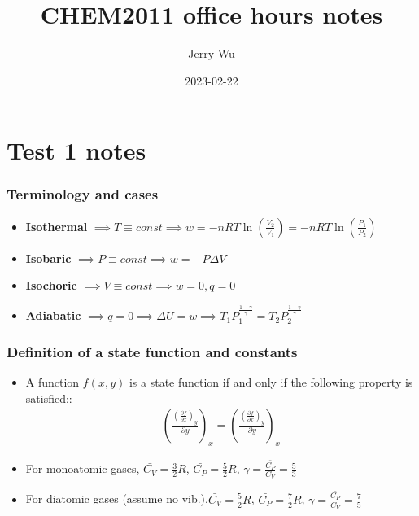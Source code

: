 \documentclass[12pt]{book}
\title{CHEM2011 office hours notes}
\author{Jerry Wu}
\date{2023-02-22}
\begin{document}
\maketitle
\chapter*{Test 1 notes}

\subsection*{Terminology and cases}

\begin{itemize}
    \item \textbf{Isothermal} $\implies T\equiv const\implies w=-nRT\ln(\frac{V_2}{V_1})=-nRT\ln(\frac{P_1}{P_2})$
    \item \textbf{Isobaric} $\implies P\equiv const\implies w=-P\Delta V$
    \item \textbf{Isochoric} $\implies V\equiv const\implies w=0,q=0$
    \item \textbf{Adiabatic} $\implies q=0\implies \Delta U=w\implies T_1P_1^{\frac{1-\gamma}{\gamma}}=T_2P_2^{\frac{1-\gamma}{\gamma}}$
\end{itemize}

\subsection*{Definition of a state function and constants}

\begin{itemize}
    \item A function $f(x,y)$ is a state function if and only if the following property is satisfied::
    \begin{align*}
        \left(\frac{\left(\frac{\partial f}{\partial x}\right)_y}{\partial y}\right)_x=\left(\frac{\left(\frac{\partial f}{\partial x}\right)_y}{\partial y}\right)_x
    \end{align*}
    \item For monoatomic gases, $\bar{C_V}=\frac{3}{2}R$, $\bar{C_P}=\frac{5}{2}R$, $\gamma=\frac{\bar{C_P}}{C_V}=\frac{5}{3}$
    \item For diatomic gases (assume no vib.),$\bar{C_V}=\frac{5}{2}R$, $\bar{C_P}=\frac{7}{2}R$, $\gamma=\frac{\bar{C_P}}{C_V}=\frac{7}{5}$
\end{itemize}
\end{document}
